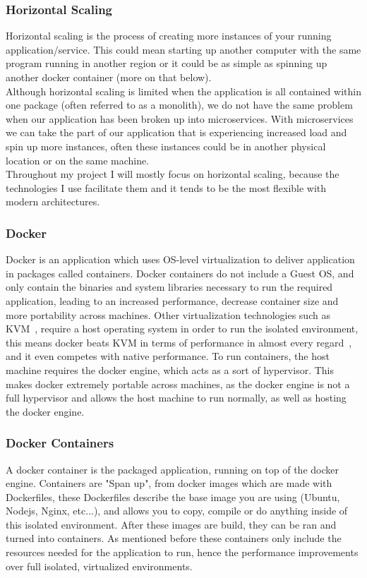 \documentclass[titlepage]{article}
\begin{document}
\subsubsection{Horizontal Scaling}
Horizontal scaling is the process of creating more instances of your running application/service. This could mean starting up another computer with the same program running in another region or it could be as simple as spinning up another docker container (more on that below). \\

Although horizontal scaling is limited when the application is all contained within one package (often referred to as a monolith), we do not have the same problem when our application has been broken up into microservices. With microservices we can take the part of our application that is experiencing increased load and spin up more instances, often these instances could be in another physical location or on the same machine. \\

Throughout my project I will mostly focus on horizontal scaling, because the technologies I use facilitate them and it tends to be the most flexible with modern architectures.

\subsubsection{Docker}
Docker is an application which uses OS-level virtualization to deliver application in packages called containers. Docker containers do not include a Guest OS, and only contain the binaries and system libraries necessary to run the required application, leading to an increased performance, decrease container size and more portability across machines. Other virtualization technologies such as KVM~\cite{kvm}, require a host operating system in order to run the isolated environment, this means docker beats KVM in terms of performance in almost every regard~\cite{docker_performance}, and it even competes with native performance. To run containers, the host machine requires the docker engine, which acts as a sort of hypervisor. This makes docker extremely portable across machines, as the docker engine is not a full hypervisor and allows the host machine to run normally, as well as hosting the docker engine.

\subsubsection{Docker Containers}
A docker container is the packaged application, running on top of the docker engine. Containers are "Span up", from docker images which are made with Dockerfiles, these Dockerfiles describe the base image you are using (Ubuntu, Nodejs, Nginx, etc...), and allows you to copy, compile or do anything inside of this isolated environment. After these images are build, they can be ran and turned into containers. As mentioned before these containers only include the resources needed for the application to run, hence the performance improvements over full isolated, virtualized environments.
\end{document}
